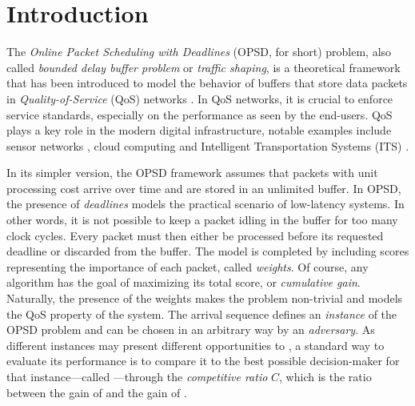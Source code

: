 \section{Introduction}
The \textit{Online Packet Scheduling with Deadlines} (OPSD, for short) problem, also called \textit{bounded delay buffer problem} or \textit{traffic shaping}, is a theoretical framework that has been introduced to model the behavior of buffers that store data packets in \textit{Quality-of-Service} (QoS) networks \citep{karakus2017quality}. In QoS networks, it is crucial to enforce service standards, especially on the performance as seen by the end-users. QoS plays a key role in the modern digital infrastructure, notable examples include sensor networks \citep{iyer2003qos}, cloud computing \citep{szigeti2013end} and Intelligent Transportation Systems (ITS) \citep{belamri2021survey}.

In its simpler version, the OPSD framework assumes that packets with unit processing cost arrive over time and are stored in an unlimited buffer. 
In OPSD, the presence of \textit{deadlines} models the practical scenario of low-latency systems. In other words, it is not possible to keep a packet idling in the buffer for too many clock cycles. Every packet must then either be processed before its requested deadline or discarded from the buffer. The model is completed by including scores representing the importance of each packet, called \textit{weights}. Of course, any algorithm \alg has the goal of maximizing its total score, or \textit{cumulative gain}. 
Naturally, the presence of the weights makes the problem non-trivial and models the QoS property of the system. The arrival sequence defines an \textit{instance} of the OPSD problem and can be chosen in an arbitrary way by an \textit{adversary}. As different instances may present different opportunities to \alg, a standard way to evaluate its performance is to compare it to the best possible decision-maker for that instance---called \opt---through the \textit{competitive ratio} $C$, which is the ratio between the gain of \opt and the gain of \alg.


